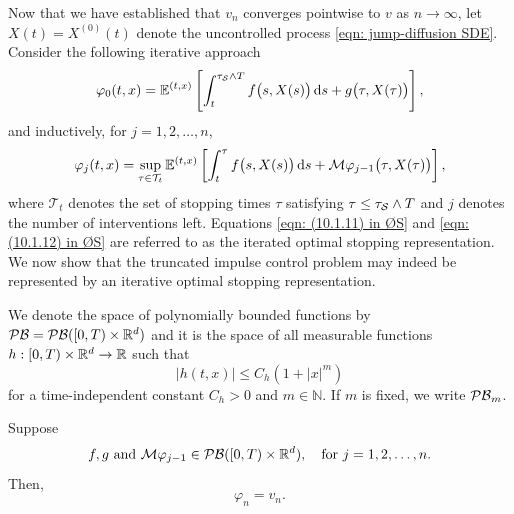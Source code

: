 Now that we have established that $v_n$ converges pointwise to $v$ as $n \rightarrow \infty$, let $X(t) = X^{(0)}(t)$ denote the uncontrolled process \eqref{eqn: jump-diffusion SDE}. Consider the following iterative approach
\begin{equation}
    \varphi_0(t,x) = \mathbb{E}^{(t,x)} \left[\int_t^{\tau_{\mathcal{S}} \wedge T} f\big(s,X(s)\big) \,\mathrm{d} s + g\big(\tau,X(\tau)\big) \right],
    \label{eqn: (10.1.11) in ØS}
\end{equation}
and inductively, for $j=1,2,\ldots,n$,
\begin{equation}
    \varphi_j(t,x) = \sup_{\tau \in \mathcal{T}_t} \mathbb{E}^{(t,x)} \left[\int_t^{\tau} f\big(s,X(s)\big) \,\mathrm{d} s + \mathcal{M} \varphi_{j-1}\big(\tau, X(\tau)\big) \right],
    \label{eqn: (10.1.12) in ØS}
\end{equation}
where $\mathcal{T}_t$ denotes the set of stopping times $\tau$ satisfying $\tau \leq \tau_{\mathcal{S}} \wedge T$ and $j$ denotes the number of interventions left. Equations \eqref{eqn: (10.1.11) in ØS} and \eqref{eqn: (10.1.12) in ØS} are referred to as the iterated optimal stopping representation. We now show that the truncated impulse control problem may indeed be represented by an iterative optimal stopping representation.
\begin{definition} 
\label{def: Space of Polynomially Bounded Functions}
    We denote the space of polynomially bounded functions by $\mathcal{PB} = \mathcal{PB}([0,T) \times \mathbb{R}^d)$ and it is the space of all measurable functions $h: [0,T) \times \mathbb{R}^d \rightarrow \mathbb{R}$ such that 
    \begin{equation*}
        |h(t,x)| \leq C_h(1+|x|^m)
    \end{equation*}
    for a time-independent constant $C_h>0$ and $m \in \mathbb N$. If $m$ is fixed, we write $\mathcal{PB}_m$. 
\end{definition}
\begin{theorem}
    \label{trm: Theorem 10.2 in ØS}
    Suppose 
    \begin{equation}
        f, g \text{ and } \mathcal{M} \varphi_{j-1} \in \mathcal{PB}([0,T) \times \mathbb{R}^d), \quad \text{for } j=1,2,\ldots,n.
        \label{eqn: (10.1.14) in ØS}
    \end{equation}
    Then, 
    \begin{equation*}
        \varphi_n = v_n.
    \end{equation*}
\end{theorem}


